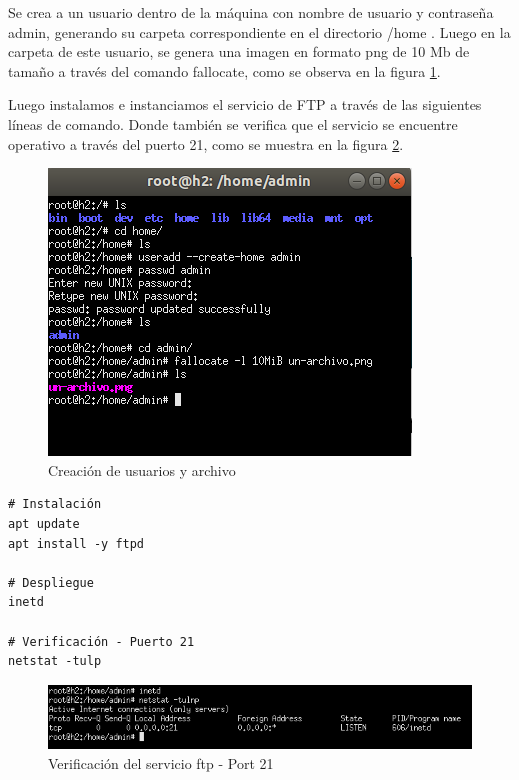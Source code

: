 \documentclass[10pt]{article}
\begin{document}
Se crea a un usuario dentro de la máquina con nombre de usuario y contraseña admin, generando su carpeta correspondiente en el directorio /home . Luego en la carpeta de este usuario, se genera una imagen en formato png de 10 Mb de tamaño a través del comando fallocate, como se observa en la figura \ref{fig:item04_servidor}. \newline

\noindent
Luego instalamos e instanciamos el servicio de FTP a través de las siguientes líneas de comando. Donde también se verifica que el servicio se encuentre operativo a través del puerto 21, como se muestra en la figura \ref{fig:item04_port21}.\newline

\begin{multicols}{2}

\begin{figure}[H]
    \centering
    \includegraphics[width=0.9\linewidth]{Imagenes/item04_user_and_file.png}
    \caption{Creación de usuarios y archivo}
    \label{fig:item04_servidor}
\end{figure}
\hfill
\columnbreak
\hfill
\begin{verbatim}
# Instalación
apt update
apt install -y ftpd

# Despliegue
inetd

# Verificación - Puerto 21
netstat -tulp
\end{verbatim}
\hfill
\begin{figure}[H]
    \centering
    \includegraphics[width=\linewidth]{Imagenes/item04_ftp_service.png}
    \caption{Verificación del servicio ftp - Port 21}
    \label{fig:item04_port21}
\end{figure}

\end{multicols}
\end{document}
